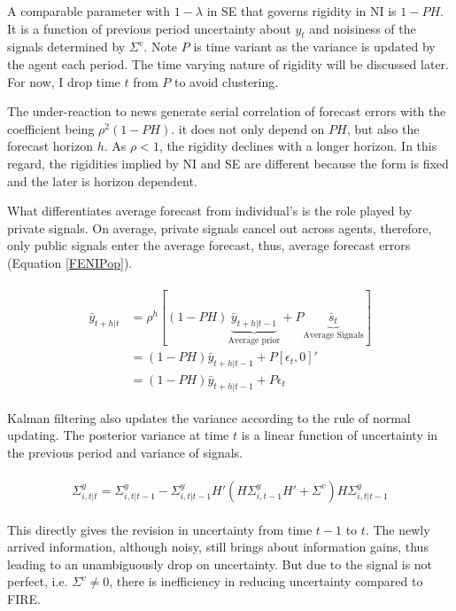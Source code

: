 \documentclass[]{article}
\begin{document}
	
	A comparable parameter with $1-\lambda$ in SE that governs rigidity in NI is $1-PH$. It is a function of previous period uncertainty about $y_t$ and noisiness of the signals determined by $\Sigma^v$. Note $P$ is time variant as the variance is updated by the agent each period. The time varying nature of rigidity will be discussed later. For now, I drop time $t$ from $P$ to avoid clustering.  
	
	The under-reaction to news generate serial correlation of forecast errors with the coefficient being $\rho^2(1-PH)$. it does not only depend on $PH$, but also the forecast horizon $h$. As $\rho<1$, the rigidity declines with a longer horizon. In this regard, the rigidities implied by NI and SE are different because the form is fixed and the later is horizon dependent. 
	
	What differentiates average forecast from individual's is the role played by private signals. On average, private signals cancel out across agents, therefore, only public signals enter the average forecast, thus, average forecast errors (Equation \ref{FENIPop}). 
	
	\begin{eqnarray}\label{FENIPop}
		\begin{aligned}
			\bar y_{t+h|t} & = \rho^h [(1-PH) \underbrace{\bar  y_{t+h|t-1}}_{\text{Average prior}} + P \underbrace{\bar s_{t}}_{\text{Average Signals}}] \\
			& = (1-PH) \bar y_{t+h|t-1}+ P [\epsilon_t, 0]' \\
			& = (1-PH) \bar y_{t+h|t-1} + P \epsilon_t
		\end{aligned}
	\end{eqnarray}
	
	Kalman filtering also updates the variance according to the rule of normal updating.   The posterior variance at time $t$ is a linear function of uncertainty in the previous period and variance of signals. 
	
	\begin{eqnarray}
		\begin{aligned}
			\Sigma^y_{i,t|t} = \Sigma^y_{i,t|t-1} - \Sigma^y_{i,t|t-1} H'(H \Sigma^y_{i,t-1} H' +\Sigma^v) H \Sigma^y_{i,t|t-1} 
		\end{aligned}
	\end{eqnarray}
	
	This directly gives the revision in uncertainty from time $t-1$ to $t$. The newly arrived information, although noisy, still brings about information gains, thus leading to an unambiguously drop on uncertainty. But due to the signal is not perfect, i.e. $\Sigma^v \neq 0$, there is inefficiency in reducing uncertainty compared to FIRE. 
	
\end{document}
